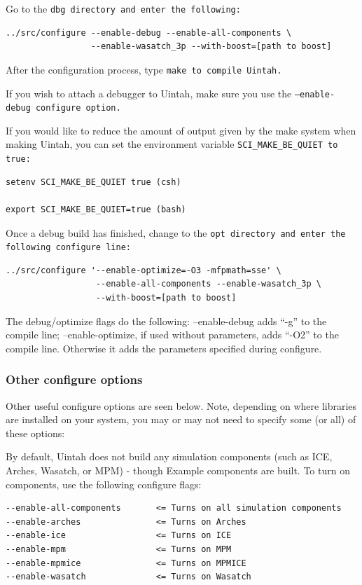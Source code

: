 \documentclass[12pt]{article}
\newcommand{\TT}[1]{\tt{#1} \normalfont}
\begin{document}
Go to the \TT{dbg} directory and enter the following:

\begin{verbatim}
../src/configure --enable-debug --enable-all-components \
                 --enable-wasatch_3p --with-boost=[path to boost]
\end{verbatim}


After the configuration process, type \TT{make} to compile Uintah.

If you wish to attach a debugger to Uintah, make sure you use the
\TT{--enable-debug} configure option.

If you would like to reduce the amount of output given by the make
system when making Uintah, you can set the environment variable
\TT{SCI\_MAKE\_BE\_QUIET} to true:

\begin{verbatim}
setenv SCI_MAKE_BE_QUIET true (csh)

export SCI_MAKE_BE_QUIET=true (bash)
\end{verbatim}

Once a debug build has finished, change to the \TT{opt} directory and
enter the following configure line:

\begin{verbatim}
../src/configure '--enable-optimize=-O3 -mfpmath=sse' \
                  --enable-all-components --enable-wasatch_3p \
                  --with-boost=[path to boost]
\end{verbatim}

The debug/optimize flags do the following:  --enable-debug adds ``-g''
to the compile line; --enable-optimize, if used without parameters,
adds ``-O2'' to the compile line.  Otherwise it adds the parameters
specified during configure.

\subsubsection{Other configure options}

Other useful configure options are seen below.  Note, depending on
where libraries are installed on your system, you may or may not need
to specify some (or all) of these options:

By default, Uintah does not build any simulation components (such as
ICE, Arches, Wasatch, or MPM) - though Example components are built.
To turn on components, use the following configure flags:

\begin{verbatim}
--enable-all-components       <= Turns on all simulation components
--enable-arches               <= Turns on Arches
--enable-ice                  <= Turns on ICE
--enable-mpm                  <= Turns on MPM
--enable-mpmice               <= Turns on MPMICE
--enable-wasatch              <= Turns on Wasatch
\end{verbatim}
\end{document}
